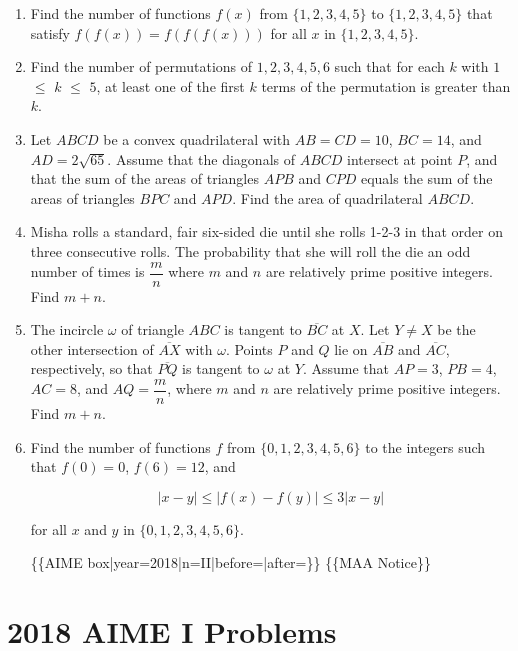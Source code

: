 \documentclass{article}
\begin{document}
\begin{enumerate}[label=\arabic*., itemsep=0.5em]
\par \vspace{0.5em}\item Find the number of functions \(f(x)\) from \(\{1, 2, 3, 4, 5\}\) to \(\{1, 2, 3, 4, 5\}\) that satisfy \(f(f(x)) = f(f(f(x)))\) for all \(x\) in \(\{1, 2, 3, 4, 5\}\).\par \vspace{0.5em}\item Find the number of permutations of \(1, 2, 3, 4, 5, 6\) such that for each \(k\) with \(1\) \(\leq\) \(k\) \(\leq\) \(5\), at least one of the first \(k\) terms of the permutation is greater than \(k\).\par \vspace{0.5em}\item Let \(ABCD\) be a convex quadrilateral with \(AB = CD = 10\), \(BC = 14\), and \(AD = 2\sqrt{65}\). Assume that the diagonals of \(ABCD\) intersect at point \(P\), and that the sum of the areas of triangles \(APB\) and \(CPD\) equals the sum of the areas of triangles \(BPC\) and \(APD\). Find the area of quadrilateral \(ABCD\).\par \vspace{0.5em}\item Misha rolls a standard, fair six-sided die until she rolls 1-2-3 in that order on three consecutive rolls. The probability that she will roll the die an odd number of times is \(\dfrac{m}{n}\) where \(m\) and \(n\) are relatively prime positive integers. Find \(m+n\).\par \vspace{0.5em}\item The incircle \(\omega\) of triangle \(ABC\) is tangent to \(\overline{BC}\) at \(X\). Let \(Y \neq X\) be the other intersection of \(\overline{AX}\) with \(\omega\). Points \(P\) and \(Q\) lie on \(\overline{AB}\) and \(\overline{AC}\), respectively, so that \(\overline{PQ}\) is tangent to \(\omega\) at \(Y\). Assume that \(AP = 3\), \(PB = 4\), \(AC = 8\), and \(AQ = \dfrac{m}{n}\), where \(m\) and \(n\) are relatively prime positive integers. Find \(m+n\).\par \vspace{0.5em}\item Find the number of functions \(f\) from \(\{0, 1, 2, 3, 4, 5, 6\}\) to the integers such that \(f(0) = 0\), \(f(6) = 12\), and


\begin{equation*}
|x - y|  \leq  |f(x) - f(y)|  \leq  3|x - y|
\end{equation*}


for all \(x\) and \(y\) in \(\{0, 1, 2, 3, 4, 5, 6\}\).



\{\{AIME box|year=2018|n=II|before=|after=\}\}
\{\{MAA Notice\}\}\par \vspace{0.5em}
\end{enumerate}
\newpage\section*{2018 AIME I Problems}
\end{document}
